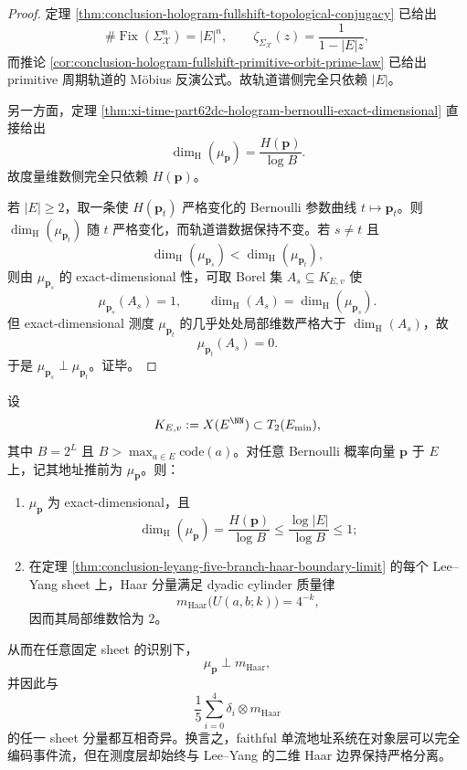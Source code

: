 \begin{proof}
定理 \ref{thm:conclusion-hologram-fullshift-topological-conjugacy} 已给出
\[
\#\operatorname{Fix}(\Sigma_{\mathcal X}^n)=|E|^n,
\qquad
\zeta_{\Sigma_{\mathcal X}}(z)=\frac{1}{1-|E|z},
\]
而推论 \ref{cor:conclusion-hologram-fullshift-primitive-orbit-prime-law} 已给出 primitive 周期轨道的 Möbius 反演公式。故轨道谱侧完全只依赖 \(|E|\)。

另一方面，定理 \ref{thm:xi-time-part62dc-hologram-bernoulli-exact-dimensional} 直接给出
\[
\dim_{\mathrm H}(\mu_{\mathbf p})=\frac{H(\mathbf p)}{\log B}.
\]
故度量维数侧完全只依赖 \(H(\mathbf p)\)。

若 \(|E|\ge 2\)，取一条使 \(H(\mathbf p_t)\) 严格变化的 Bernoulli 参数曲线 \(t\mapsto \mathbf p_t\)。则 \(\dim_{\mathrm H}(\mu_{\mathbf p_t})\) 随 \(t\) 严格变化，而轨道谱数据保持不变。若 \(s\neq t\) 且
\[
\dim_{\mathrm H}(\mu_{\mathbf p_s})<\dim_{\mathrm H}(\mu_{\mathbf p_t}),
\]
则由 \(\mu_{\mathbf p_s}\) 的 exact-dimensional 性，可取 Borel 集 \(A_s\subseteq K_{E,v}\) 使
\[
\mu_{\mathbf p_s}(A_s)=1,
\qquad
\dim_{\mathrm H}(A_s)=\dim_{\mathrm H}(\mu_{\mathbf p_s}).
\]
但 exact-dimensional 测度 \(\mu_{\mathbf p_t}\) 的几乎处处局部维数严格大于 \(\dim_{\mathrm H}(A_s)\)，故
\[
\mu_{\mathbf p_t}(A_s)=0.
\]
于是 \(\mu_{\mathbf p_s}\perp \mu_{\mathbf p_t}\)。证毕。
\end{proof}

\begin{theorem}\label{thm:conclusion-hologram-leyang-haar-dimension-separation}
设
\[
K_{E,v}:=X(E^{\NN})\subset T_2(E_{\min}),
\]
其中 \(B=2^L\) 且 \(B>\max_{a\in E}\mathrm{code}(a)\)。对任意 Bernoulli 概率向量 \(\mathbf p\) 于 \(E\) 上，记其地址推前为 \(\mu_{\mathbf p}\)。则：
\begin{enumerate}
  \item \(\mu_{\mathbf p}\) 为 exact-dimensional，且
        \[
        \dim_{\mathrm H}(\mu_{\mathbf p})
        =
        \frac{H(\mathbf p)}{\log B}
        \le
        \frac{\log|E|}{\log B}
        \le 1;
        \]
  \item 在定理 \ref{thm:conclusion-leyang-five-branch-haar-boundary-limit} 的每个 Lee--Yang sheet 上，Haar 分量满足 dyadic cylinder 质量律
        \[
        m_{\mathrm{Haar}}\bigl(U(a,b;k)\bigr)=4^{-k},
        \]
        因而其局部维数恰为 \(2\)。
\end{enumerate}
从而在任意固定 sheet 的识别下，
\[
\mu_{\mathbf p}\perp m_{\mathrm{Haar}},
\]
并因此与
\[
\frac15\sum_{i=0}^{4}\delta_i\otimes m_{\mathrm{Haar}}
\]
的任一 sheet 分量都互相奇异。换言之，faithful 单流地址系统在对象层可以完全编码事件流，但在测度层却始终与 Lee--Yang 的二维 Haar 边界保持严格分离。
\end{theorem}

